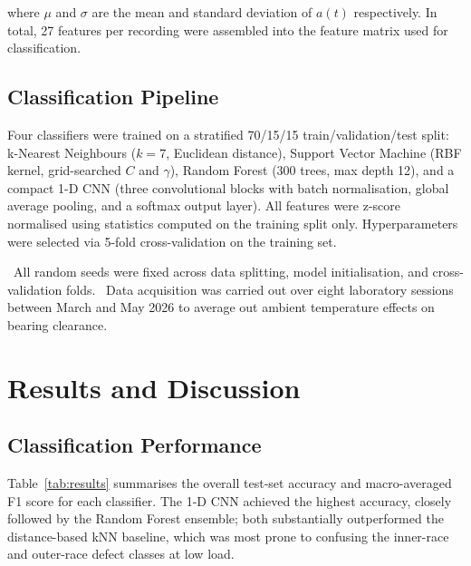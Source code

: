 \documentclass[12pt,a4paper]{report}
\begin{document}
\noindent where $\mu$ and $\sigma$ are the mean and standard deviation of $a(t)$ respectively.
In total, 27 features per recording were assembled into the feature matrix used for
classification.

\section{Classification Pipeline}
Four classifiers were trained on a stratified 70/15/15 train/validation/test split: k-Nearest
Neighbours ($k=7$, Euclidean distance), Support Vector Machine (RBF kernel, grid-searched $C$
and $\gamma$), Random Forest (300 trees, max depth 12), and a compact 1-D CNN (three
convolutional blocks with batch normalisation, global average pooling, and a softmax output
layer). All features were z-score normalised using statistics computed on the training split
only. Hyperparameters were selected via 5-fold cross-validation on the training set.

\begin{tcolorbox}[notebox,title={Reproducibility Note}]
\faFile\ All random seeds were fixed across data splitting, model initialisation, and
cross-validation folds. \faCalendar\ Data acquisition was carried out over eight laboratory
sessions between March and May 2026 to average out ambient temperature effects on bearing
clearance.
\end{tcolorbox}

\chapter{Results and Discussion}
\label{ch:results}

\section{Classification Performance}
Table~\ref{tab:results} summarises the overall test-set accuracy and macro-averaged F1 score for
each classifier. The 1-D CNN achieved the highest accuracy, closely followed by the Random
Forest ensemble; both substantially outperformed the distance-based kNN baseline, which was most
prone to confusing the inner-race and outer-race defect classes at low load.
\end{document}
